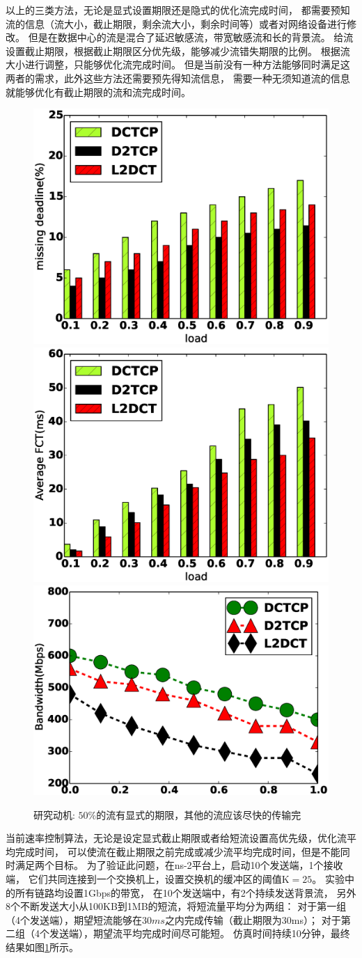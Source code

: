 以上的三类方法，无论是显式设置期限还是隐式的优化流完成时间，
都需要预知流的信息（流大小，截止期限，剩余流大小，剩余时间等）或者对网络设备进行修改。
但是在数据中心的流是混合了延迟敏感流，带宽敏感流和长的背景流。
给流设置截止期限，根据截止期限区分优先级，能够减少流错失期限的比例。
根据流大小进行调整，只能够优化流完成时间。 
但是当前没有一种方法能够同时满足这两者的需求，此外这些方法还需要预先得知流信息，
需要一种无须知道流的信息就能够优化有截止期限的流和流完成时间。


\begin{figure}[h]
\centering
{}
 {\includegraphics[width=0.32\columnwidth]{figures/FDRC/motivation/miss_deadline.eps}}
{\includegraphics[width=0.32\columnwidth]{figures/FDRC/motivation/fct.eps}}
{\includegraphics[width=0.32\columnwidth]{figures/FDRC/motivation/bandwidth.eps}}
\caption{研究动机: $50\%$的流有显式的期限，其他的流应该尽快的传输完}
\label{fdrc-motivation-fig}
\end{figure}

当前速率控制算法，无论是设定显式截止期限或者给短流设置高优先级，优化流平均完成时间，
可以使流在截止期限之前完成或减少流平均完成时间，但是不能同时满足两个目标。
为了验证此问题，在ns-2平台上，启动10个发送端，1个接收端，
它们共同连接到一个交换机上，设置交换机的缓冲区的阈值K$=25$。
实验中的所有链路均设置1Gbps的带宽，
在10个发送端中，有2个持续发送背景流，
另外8个不断发送大小从100KB到1MB的短流，将短流量平均分为两组：
对于第一组（4个发送端），期望短流能够在$30ms$之内完成传输（截止期限为30ms）；
对于第二组（4个发送端），期望流平均完成时间尽可能短。
仿真时间持续10分钟，最终结果如图\ref{fdrc-motivation-fig}所示。

